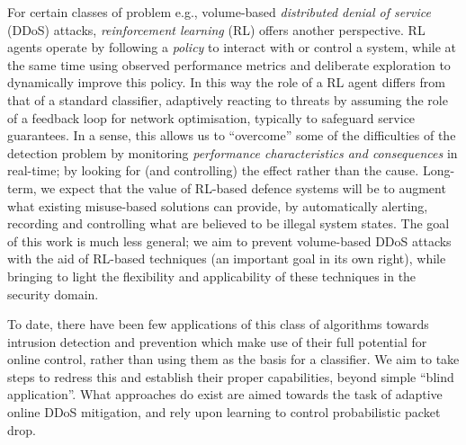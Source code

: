 \documentclass[10pt, times, comsoc]{IEEEtran}
\begin{document}
For certain classes of problem e.g., volume-based \emph{distributed denial of service} (DDoS) attacks, \emph{reinforcement learning} (RL) offers another perspective.
RL agents operate by following a \emph{policy} to interact with or control a system, while at the same time using observed performance metrics and deliberate exploration to dynamically improve this policy.
In this way the role of a RL agent differs from that of a standard classifier, adaptively reacting to threats by assuming the role of a feedback loop for network optimisation, typically to safeguard service guarantees.
In a sense, this allows us to ``overcome'' some of the difficulties of the detection problem by monitoring \emph{performance characteristics and consequences} in real-time; by looking for (and controlling) the effect rather than the cause.
Long-term, we expect that the value of RL-based defence systems will be to augment what existing misuse-based solutions can provide, by automatically alerting, recording and controlling what are believed to be illegal system states.
The goal of this work is much less general; we aim to prevent volume-based DDoS attacks with the aid of RL-based techniques (an important goal in its own right), while bringing to light the flexibility and applicability of these techniques in the security domain.

To date, there have been few applications of this class of algorithms towards intrusion detection and prevention which make use of their full potential for online control, rather than using them as the basis for a classifier.
We aim to take steps to redress this and establish their proper capabilities, beyond simple ``blind application''.
What approaches do exist are aimed towards the task of adaptive online DDoS mitigation, and rely upon learning to control probabilistic packet drop.
\end{document}
